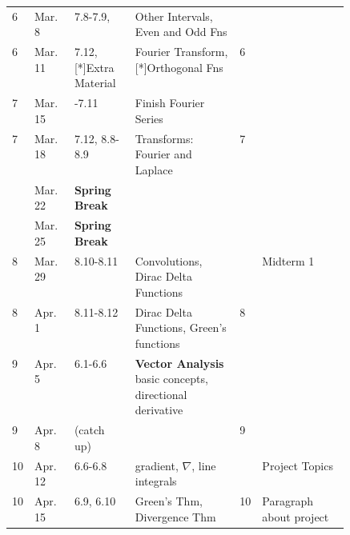 \documentclass[12pt]{article}
\begin{document}
{\begin{table}[h]
\begin{tabular}{l|l|p{0.18\linewidth}|p{0.31\linewidth}|l|l}
6             & Mar. 8      & 7.8-7.9, & Other Intervals, Even and Odd Fns &  &                  \\ 
6             & Mar. 11        & 7.12, [*]Extra Material &Fourier Transform, [*]Orthogonal Fns & 6 &                 \\ \hline 
7             & Mar. 15        & -7.11 & Finish Fourier Series & &                  \\  
7             & Mar. 18        & 7.12, 8.8-8.9  & Transforms: Fourier and Laplace & 7 &                 \\ \hline 
              & Mar. 22        & \textbf{Spring Break} &  &  &                   \\ 
              & Mar. 25        & \textbf{Spring Break} &  &  &                   \\ \hline
8             & Mar. 29       & 8.10-8.11 & Convolutions, Dirac Delta Functions  &  & Midterm 1                  \\  
8             & Apr. 1      & 8.11-8.12 & Dirac Delta Functions, Green's functions & 8 &                   \\ \hline  
9             & Apr. 5       & 6.1-6.6 & \textbf{Vector Analysis} basic concepts, directional derivative &  &                  \\ 
9             & Apr. 8        &(catch up) & & 9 &                   \\ \hline 
10             & Apr. 12      &6.6-6.8 & gradient, $\nabla$, line integrals &  &  Project Topics                 \\ 
10             & Apr. 15       &6.9, 6.10 & Green's Thm, Divergence Thm & 10 &  Paragraph about project                 \\ \hline 

\end{tabular}
\end{table}}
\end{document}
